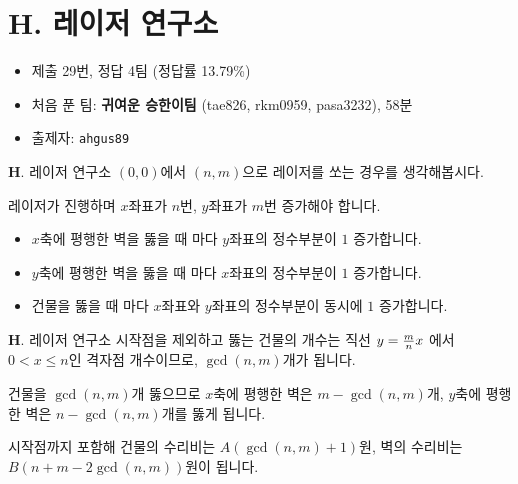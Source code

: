 \section{H. 레이저 연구소}

\begin{frame} %
    \begin{itemize}
        \item 제출 29번, 정답 4팀 (정답률 13.79\%)
        \item 처음 푼 팀: \textbf{귀여운 승한이팀} (tae826, rkm0959, pasa3232), 58분
        \item 출제자: \texttt{ahgus89}
    \end{itemize}
\end{frame}

\begin{frame}{\textbf{H}. 레이저 연구소}
    $(0, 0)$에서 $(n, m)$으로 레이저를 쏘는 경우를 생각해봅시다.

    \vspace{18pt}
    
    레이저가 진행하며 $x$좌표가 $n$번, $y$좌표가 $m$번 증가해야 합니다. 
    
    \vspace{18pt}
    \begin{itemize}
        \item $x$축에 평행한 벽을 뚫을 때 마다 $y$좌표의 정수부분이 $1$ 증가합니다.
        \item $y$축에 평행한 벽을 뚫을 때 마다 $x$좌표의 정수부분이 $1$ 증가합니다.
        \item 건물을 뚫을 때 마다 $x$좌표와 $y$좌표의 정수부분이 동시에 $1$ 증가합니다.
    \end{itemize}

\end{frame}

\begin{frame}{\textbf{H}. 레이저 연구소}
    시작점을 제외하고 뚫는 건물의 개수는 직선 $y={m \over n}x$ 에서 $0 < x \leq n$인 격자점 개수이므로, $\operatorname{gcd}(n, m)$개가 됩니다.
    
    \vspace{18pt}
    
    건물을 $\operatorname{gcd}(n, m)$개 뚫으므로 $x$축에 평행한 벽은 $m-\operatorname{gcd}(n, m)$개, $y$축에 평행한 벽은 $n-\operatorname{gcd}(n, m)$개를 뚫게 됩니다. 
    
    \vspace{18pt} 
     
    시작점까지 포함해 건물의 수리비는 $A(\operatorname{gcd}(n, m)+1)$원, 벽의 수리비는 $B(n+m-2\operatorname{gcd}(n, m))$원이 됩니다.
    
\end{frame}

